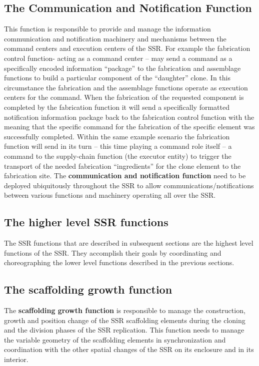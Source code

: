 \bigskip

\subsection[The Communication and Notification Function]{The
Communication and Notification Function}
\hypertarget{RefHeading3090306210128}{}This function is responsible to
provide and manage the information communication and notification
machinery and mechanisms between the command centers and execution
centers of the SSR. For example the fabrication control function-
acting as a command center – may send a command as a specifically
encoded information “package”  to the fabrication and assemblage
functions to build a particular component of the “daughter” clone. In
this circumstance the fabrication and the assemblage functions operate
as execution centers for the command. When the fabrication of the
requested component is completed by the fabrication function it will
send a specifically formatted notification information package back to
the fabrication control function with the meaning that the specific
command for the fabrication of the specific element was successfully
completed. Within the same example scenario the fabrication function
will send in its turn – this time playing a command role itself – a
command to the supply-chain function (the executor entity) to trigger
the transport of the needed fabrication “ingredients” for the clone
element to the fabrication site. The \textbf{communication and
notification function} need to be deployed ubiquitously throughout the
SSR to allow communications/notifications between various functions and
machinery operating all over the SSR.


\bigskip

\subsection[The higher level SSR functions]{The higher level SSR
functions}
\hypertarget{RefHeading3092306210128}{}The SSR functions that are
described in subsequent sections are the highest level functions of the
SSR. They accomplish their goals by coordinating and choreographing the
lower level functions described in the previous sections.


\bigskip

\subsection[The scaffolding growth function]{The scaffolding growth
function}
\hypertarget{RefHeading3094306210128}{}The \textbf{scaffolding growth
function} is responsible to manage the construction, growth and
position change of the SSR scaffolding elements during the cloning and
the division phases of the SSR replication. This function needs to
manage the variable geometry of the scaffolding elements in
synchronization and coordination with the other spatial changes of the
SSR on its enclosure and in its interior.



